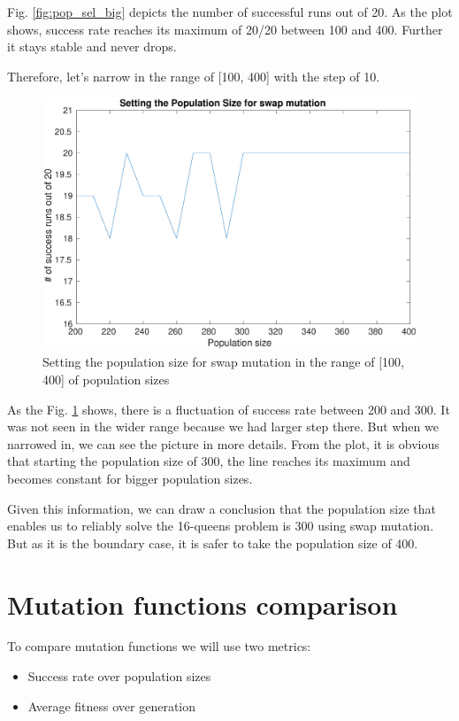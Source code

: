 \documentclass[12pt, a4paper]{article}
\begin{document}
        Fig. \ref{fig:pop_sel_big} depicts the number of successful runs out of 20.
        As the plot shows, success rate reaches its maximum of 20/20 between 100
        and 400. Further it stays stable and never drops.

        Therefore, let's narrow in the range of [100, 400] with the step of 10.

        \begin{figure}[H]
            \centering
            \includegraphics[width=\linewidth]{pop_selection_zoom.eps}
            \caption{Setting the population size for swap mutation in the range
                of [100, 400] of population sizes}
            \label{fig:pop_sel_lil}
        \end{figure}

        As the Fig. \ref{fig:pop_sel_lil} shows, there is a fluctuation of
        success rate between 200 and 300. It was not seen in the wider range
        because we had larger step there. But when we narrowed in, we can see
        the picture in more details. From the plot, it is obvious that starting
        the population size of 300, the line reaches its maximum and becomes
        constant for bigger population sizes.

        Given this information, we can draw a conclusion that the population
        size that enables us to reliably solve the 16-queens problem is 300
        using swap mutation. But as it is the boundary case, it is safer to
        take the population size of 400.

    \section{Mutation functions comparison}
        To compare mutation functions we will use two metrics:
        \begin{itemize}
            \item Success rate over population sizes
            \item Average fitness over generation
        \end{itemize}
\end{document}
